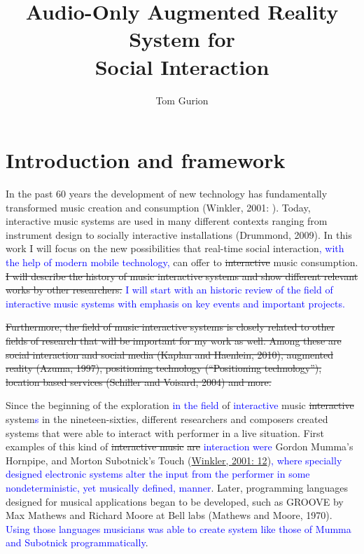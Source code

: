 \documentclass[a4paper,11pt]{article}
\title{Audio-Only Augmented Reality System for\\Social Interaction}
\author{Tom Gurion}
\newcommand{\new}[1]{\textcolor{blue}{#1}}
\begin{document}
\maketitle

\section{Introduction and framework}


In the past 60 years the development of new technology has fundamentally transformed music creation and consumption (Winkler, 2001: ). Today, interactive music systems are used in many different contexts ranging from instrument design to socially interactive installations (Drummond, 2009). In this work I will focus on the new possibilities that real-time social interaction\new{, with the help of modern mobile technology,} can offer to \st{interactive} music consumption. \st{I will describe the history of music interactive systems and show different relevant works by other researchers.} \new{I will start with an historic review of the field of interactive music systems with emphasis on key events and important projects.}

\st{Furthermore, the field of music interactive systems is closely related to other fields of research that will be important for my work as well. Among these are social interaction and social media (Kaplan and Haenlein, 2010), augmented reality (Azuma, 1997), positioning technology (``Positioning technology''), location based services (Schiller and Voisard, 2004) and more.}

Since the beginning of the exploration \new{in the field} of \new{interactive} music \st{interactive} system\new{s} in the nineteen-sixties, different researchers and composers created systems that were able to interact with performer in a live situation. First examples of this kind of \st{interactive music} \st{are} \new{interaction} \new{were} Gordon Mumma's Hornpipe, and Morton Subotnick's Touch (\href{http://blog.lib.umn.edu/geers001/emusic/14_assig_ComposingInteractiveMusicCh1-2.pdf}{Winkler, 2001: 12})\new{, where specially designed electronic systems alter the input from the performer in some nondeterministic, yet musically defined, manner}. Later, programming languages designed for musical applications began to be developed, such as GROOVE by Max Mathews and Richard Moore at Bell labs (Mathews and Moore, 1970). \new{Using those languages musicians was able to create system like those of Mumma and Subotnick programmatically}.
\end{document}
